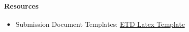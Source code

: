 \documentclass{article}
\newcommand{\mps}[1]{\textcolor{red!50!black}{\textsf{}{MPS:~~#1}}}
\begin{document}


\paragraph{Resources} 
\begin{itemize}
    \item Submission Document Templates: \href{https://grad.ncsu.edu/students/etd/etd-templates/}{ETD Latex Template}
\end{itemize}
\end{document}

